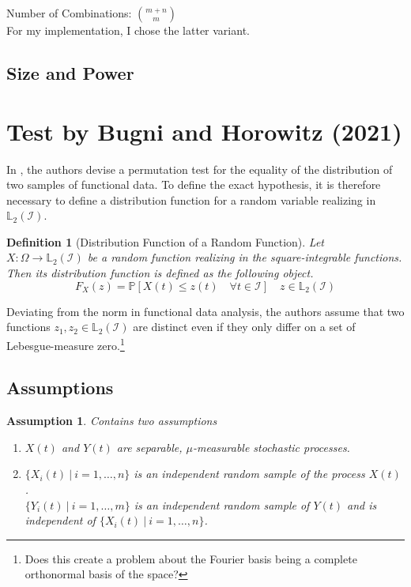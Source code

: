\documentclass[12pt, a4paper]{article}
\theoremstyle{MAstyle} \newtheorem{assumption}{Assumption}[section]
\theoremstyle{MAstyle} \newtheorem{definition}{Definition}[section]
\begin{document}
		 
			Number of Combinations: $\binom{m+n}{m}$\\
			
			For my implementation, I chose the latter variant.
	
		\subsection{Size and Power}
		
	\section{Test by Bugni and Horowitz (2021)}\label{Bugni_Horowitz_2021}
	
		In \cite{bugni_permutation_2021}, the authors devise a permutation test for the equality of the distribution of two samples of functional data. To define the exact hypothesis, it is therefore necessary to define a distribution function for a random variable realizing in $\mathbb{L}_2(\mathcal{I})$.
		\begin{definition}[Distribution Function of a Random Function]
			Let $X:\Omega \rightarrow \mathbb{L}_2(\mathcal{I})$ be a random function realizing in the square-integrable functions. Then its distribution function is defined as the following object.
			\begin{equation*}
				F_X(z) = \mathbb{P}\left[X(t) \leq z(t) \quad \forall t \in \mathcal{I}\right] \quad z \in \mathbb{L}_2(\mathcal{I})
			\end{equation*}
		\end{definition}
		Deviating from the norm in functional data analysis, the authors assume that two functions $z_1, z_2 \in \mathbb{L}_2(\mathcal{I})$ are distinct even if they only differ on a set of Lebesgue-measure zero.\footnote{Does this create a problem about the Fourier basis being a complete orthonormal basis of the space?}
		
		\subsection{Assumptions}
		
			\begin{assumption} Contains two assumptions
				\begin{enumerate}
					\item $X(t)$ and $Y(t)$ are separable, $\mu$-measurable stochastic processes.
					\item $\{X_i(t) \: \vert \: i = 1, \dots, n\}$ is an independent random sample of the process $X(t)$. \\
					$\{Y_i(t) \: \vert \: i = 1, \dots, m\}$ is an independent random sample of $Y(t)$ and is independent of $\{X_i(t) \: \vert \: i = 1, \dots, n\}$.
				\end{enumerate}
			\end{assumption}
		
\end{document}
